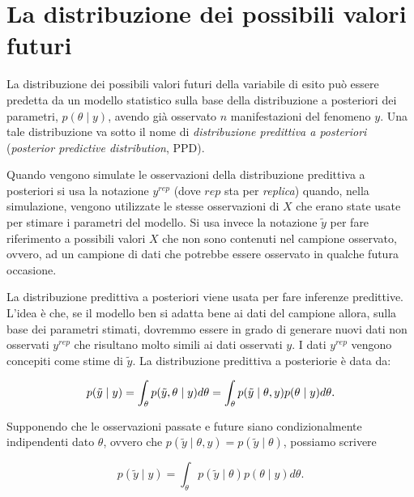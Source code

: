 \documentclass[
  11pt,
]{krantz}
\theoremstyle{definition}
\theoremstyle{definition}
\theoremstyle{definition}
\theoremstyle{definition}
\theoremstyle{remark}
\begin{document}
\hypertarget{la-distribuzione-dei-possibili-valori-futuri}{%
\section{La distribuzione dei possibili valori futuri}\label{la-distribuzione-dei-possibili-valori-futuri}}

La distribuzione dei possibili valori futuri della variabile di esito può essere predetta da un modello statistico sulla base della distribuzione a posteriori dei parametri, \(p(\theta \mid y)\), avendo già osservato \(n\) manifestazioni del fenomeno \(y\). Una tale distribuzione va sotto il nome di \emph{distribuzione predittiva a posteriori} (\emph{posterior predictive distribution}, PPD).

Quando vengono simulate le osservazioni della distribuzione predittiva a posteriori si usa la notazione \(y^{rep}\) (dove \(rep\) sta per \emph{replica}) quando, nella simulazione, vengono utilizzate le stesse osservazioni di \(X\) che erano state usate per stimare i parametri del modello. Si usa invece la notazione \(\tilde{y}\) per fare riferimento a possibili valori \(X\) che non sono contenuti nel campione osservato, ovvero, ad un campione di dati che potrebbe essere osservato in qualche futura occasione.

La distribuzione predittiva a posteriori viene usata per fare inferenze predittive. L'idea è che, se il modello ben si adatta bene ai dati del campione allora, sulla base dei parametri stimati, dovremmo essere in grado di generare nuovi dati non osservati \(y^{rep}\) che risultano molto simili ai dati osservati \(y\). I dati \(y^{rep}\) vengono concepiti come stime di \(\tilde{y}\). La distribuzione predittiva a posteriorie è data da:

\begin{equation}
p(\tilde{y} \mid y) = \int_{\theta} p(\tilde{y}, \theta \mid y) d \theta = \int_{\theta} p(\tilde{y} \mid \theta, y) p(\theta \mid y) d\theta.\notag
\end{equation}

Supponendo che le osservazioni passate e future siano condizionalmente indipendenti dato \(\theta\), ovvero che \(p(\tilde{y} \mid \theta, y) = p(\tilde{y} \mid \theta)\), possiamo scrivere

\begin{equation}
p(\tilde{y} \mid y) = \int_{\theta} p(\tilde{y} \mid \theta) p(\theta \mid y) d\theta.
\label{eq:dist-pred-post}
\end{equation}
\end{document}
